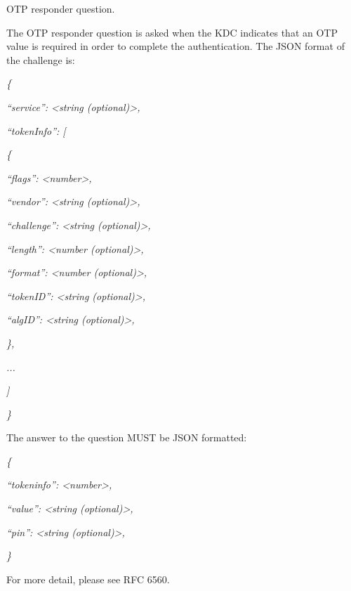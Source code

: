 \documentclass[letterpaper,10pt,english]{sphinxmanual}
\begin{document}
\begin{fulllineitems}
\label{appdev/refs/macros/KRB5_RESPONDER_QUESTION_OTP:KRB5_RESPONDER_QUESTION_OTP}
\end{fulllineitems}


OTP responder question.

The OTP responder question is asked when the KDC indicates that an OTP value is required in order to complete the authentication. The JSON format of the challenge is:

\emph{\{}

\emph{``service'': \textless{}string (optional)\textgreater{},}

\emph{``tokenInfo'': {[}}

\emph{\{}

\emph{``flags'': \textless{}number\textgreater{},}

\emph{``vendor'': \textless{}string (optional)\textgreater{},}

\emph{``challenge'': \textless{}string (optional)\textgreater{},}

\emph{``length'': \textless{}number (optional)\textgreater{},}

\emph{``format'': \textless{}number (optional)\textgreater{},}

\emph{``tokenID'': \textless{}string (optional)\textgreater{},}

\emph{``algID'': \textless{}string (optional)\textgreater{},}

\emph{\},}

\emph{...}

\emph{{]}}

\emph{\}}

The answer to the question MUST be JSON formatted:

\emph{\{}

\emph{``tokeninfo'': \textless{}number\textgreater{},}

\emph{``value'': \textless{}string (optional)\textgreater{},}

\emph{``pin'': \textless{}string (optional)\textgreater{},}

\emph{\}}

For more detail, please see RFC 6560.

\begin{tabulary}{\linewidth}{|L|L|}
\hline

 & 
\\\hline
\end{tabulary}
\end{document}
